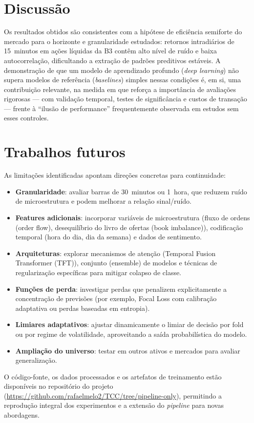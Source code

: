 \section*{Discussão}

Os resultados obtidos são consistentes com a hipótese de eficiência semiforte do mercado
para o horizonte e granularidade estudados: retornos intradiários de 15~minutos em ações
líquidas da B3 contêm alto nível de ruído e baixa autocorrelação, dificultando a extração
de padrões preditivos estáveis. A demonstração de que um modelo de aprendizado profundo (\textit{deep learning})
não supera modelos de referência (\textit{baselines}) simples nessas condições é, em si, uma contribuição relevante,
na medida em que reforça a importância de avaliações rigorosas --- com validação temporal,
testes de significância e custos de transação --- frente à ``ilusão de performance''
frequentemente observada em estudos sem esses controles.

\section*{Trabalhos futuros}

As limitações identificadas apontam direções concretas para continuidade:

\begin{itemize}
  \item \textbf{Granularidade}: avaliar barras de 30~minutos ou 1~hora, que reduzem ruído
  de microestrutura e podem melhorar a relação sinal/ruído.
  \item \textbf{Features adicionais}: incorporar variáveis de microestrutura
  (fluxo de ordens (order flow), desequilíbrio do livro de ofertas (book imbalance)), codificação temporal (hora do dia, dia da semana)
  e dados de sentimento.
  \item \textbf{Arquiteturas}: explorar mecanismos de atenção (Temporal Fusion Transformer (TFT)),
  conjunto (ensemble) de modelos e técnicas de regularização específicas para mitigar colapso de classe.
  \item \textbf{Funções de perda}: investigar perdas que penalizem explicitamente a concentração
  de previsões (por exemplo, Focal Loss com calibração adaptativa ou perdas baseadas em entropia).
  \item \textbf{Limiares adaptativos}: ajustar dinamicamente o limiar de decisão por fold ou
  por regime de volatilidade, aproveitando a saída probabilística do modelo.
  \item \textbf{Ampliação do universo}: testar em outros ativos e mercados para avaliar
  generalização.
\end{itemize}

O código-fonte, os dados processados e os artefatos de treinamento estão disponíveis no
repositório do projeto (\url{https://github.com/rafaelmelo2/TCC/tree/pipeline-only}), permitindo a reprodução integral dos experimentos e a extensão
do \textit{pipeline} para novas abordagens.
